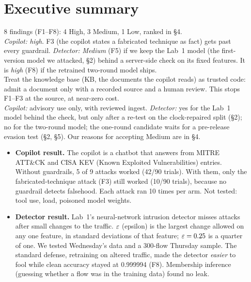 \section{Executive summary}

\begin{keypoints}
 8 findings (F1--F8): 4 High, 3 Medium, 1 Low, ranked in \S4.\\
 \emph{Copilot: high.} F3 (the copilot states a fabricated technique as fact) gets past every guardrail. \emph{Detector: Medium} (F5) if we keep the Lab~1 model (the first-version model we attacked, \S2) behind a server-side check on its fixed features. It is \emph{high} (F8) if the retrained two-round model ships.\\
 Treat the knowledge base (KB, the documents the copilot reads) as trusted code: admit a document only with a recorded source and a human review. This stops F1--F3 at the source, at near-zero cost.\\
 \emph{Copilot:} advisory use only, with reviewed ingest. \emph{Detector:} yes for the Lab~1 model behind the check, but only after a re-test on the clock-repaired split (\S2); no for the two-round model; the one-round candidate waits for a pre-release evasion test (\S2, \S5). Our reasons for accepting Medium are in \S4.
\end{keypoints}

\begin{itemize}
\item \textbf{Copilot result.} The copilot is a chatbot that answers from MITRE ATT\&CK and CISA KEV (Known Exploited Vulnerabilities) entries. Without guardrails, 5 of 9 attacks worked (42/90 trials). With them, only the fabricated-technique attack (F3) still worked (10/90 trials), because no guardrail detects falsehood. Each attack ran 10 times per arm. Not tested: tool use, load, poisoned model weights.
\item \textbf{Detector result.} Lab~1's neural-network intrusion detector misses attacks after small changes to the traffic. $\varepsilon$ (epsilon) is the largest change allowed on any one feature, in standard deviations of that feature; $\varepsilon=0.25$ is a quarter of one. We tested Wednesday's data and a 300-flow Thursday sample. The standard defense, retraining on altered traffic, made the detector \emph{easier} to fool while clean accuracy stayed at 0.999994 (F8). Membership inference (guessing whether a flow was in the training data) found no leak.
\end{itemize}

